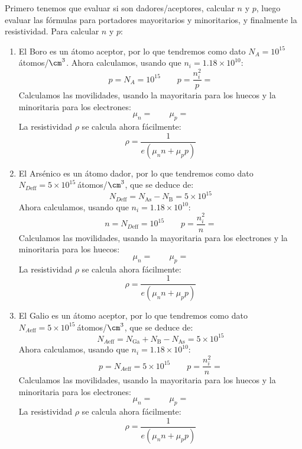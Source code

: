 	Primero tenemos que evaluar si son dadores/aceptores, calcular $n$ y $p$, luego evaluar las fórmulas para portadores mayoritarios y minoritarios, y finalmente la resistividad. Para calcular $n$ y $p$:
	\begin{enumerate}[label=\alph*)]
		\item El Boro es un átomo aceptor, por lo que tendremos como dato $N_A=10^{15} \ $átomos/$\cm^3$. Ahora calculamos, usando que $n_i=1.18\times 10^{10}$:
		\begin{equation}
			p = N_A = 10^{15} \qquad p = \frac{n_i^2}{p} =
		\end{equation}
		Calculamos las movilidades, usando la mayoritaria para los huecos y la minoritaria para los electrones:
		\begin{equation}
			\mu_n = \qquad \mu_p =
		\end{equation}
		La resistividad $\rho$ se calcula ahora fácilmente:
		\begin{equation}
			\rho = \frac{1}{e(\mu_n n + \mu_pp)}
		\end{equation}

		\item El Arsénico es un átomo dador, por lo que tendremos como dato $N_{D\text{eff}}=5 \times 10^{15} \ $átomos/$\cm^3$, que se deduce de:
		\begin{equation}
			N_{D\text{eff}} = N_{\text{As}} - N_{\text{B}} = 5 \times 10^{15}
		\end{equation}
		Ahora calculamos, usando que $n_i=1.18\times 10^{10}$:
		\begin{equation}
			n = N_{D\text{eff}} = 10^{15} \qquad p = \frac{n_i^2}{n} =
		\end{equation}
		Calculamos las movilidades, usando la mayoritaria para los electrones y la minoritaria para los huecos:
		\begin{equation}
			\mu_n = \qquad \mu_p =
		\end{equation}
		La resistividad $\rho$ se calcula ahora fácilmente:
		\begin{equation}
			\rho = \frac{1}{e(\mu_n n + \mu_pp)}
		\end{equation}

		\item El Galio es un átomo aceptor, por lo que tendremos como dato $N_{A\text{eff}}=5 \times 10^{15} \ $átomos/$\cm^3$, que se deduce de:
		\begin{equation}
			N_{A\text{eff}} = N_{\text{Ga}} + N_{\text{B}} - N_{\text{As}} = 5 \times 10^{15}
		\end{equation}
		Ahora calculamos, usando que $n_i=1.18\times 10^{10}$:
		\begin{equation}
			p = N_{A\text{eff}} = 5 \times 10^{15} \qquad p = \frac{n_i^2}{n} =
		\end{equation}
		Calculamos las movilidades, usando la mayoritaria para los huecos y la minoritaria para los electrones:
		\begin{equation}
			\mu_n = \qquad \mu_p =
		\end{equation}
		La resistividad $\rho$ se calcula ahora fácilmente:
		\begin{equation}
			\rho = \frac{1}{e(\mu_n n + \mu_pp)}
		\end{equation}
	\end{enumerate}
